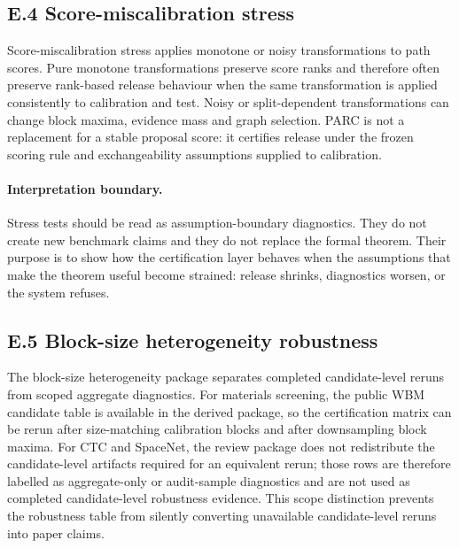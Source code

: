 \documentclass[11pt]{article}
\begin{document}
\subsection*{E.4 Score-miscalibration stress}

Score-miscalibration stress applies monotone or noisy transformations to path scores.
Pure monotone transformations preserve score ranks and therefore often preserve rank-based release behaviour when the same transformation is applied consistently to calibration and test.
Noisy or split-dependent transformations can change block maxima, evidence mass and graph selection.
PARC is not a replacement for a stable proposal score: it certifies release under the frozen scoring rule and exchangeability assumptions supplied to calibration.

\paragraph{Interpretation boundary.}
Stress tests should be read as assumption-boundary diagnostics.
They do not create new benchmark claims and they do not replace the formal theorem.
Their purpose is to show how the certification layer behaves when the assumptions that make the theorem useful become strained: release shrinks, diagnostics worsen, or the system refuses.

\subsection*{E.5 Block-size heterogeneity robustness}

The block-size heterogeneity package separates completed candidate-level reruns from scoped aggregate diagnostics.
For materials screening, the public WBM candidate table is available in the derived package, so the certification matrix can be rerun after size-matching calibration blocks and after downsampling block maxima.
For CTC and SpaceNet, the review package does not redistribute the candidate-level artifacts required for an equivalent rerun; those rows are therefore labelled as aggregate-only or audit-sample diagnostics and are not used as completed candidate-level robustness evidence.
This scope distinction prevents the robustness table from silently converting unavailable candidate-level reruns into paper claims.
\end{document}
